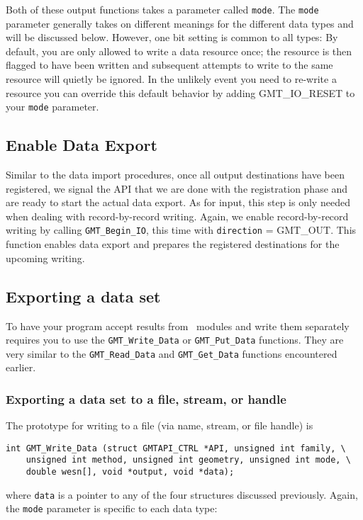 \documentclass[11pt]{report}
\begin{document}
Both of these output functions takes a parameter called \texttt{mode}.  The \texttt{mode} parameter generally
takes on different meanings for the different data types and will be discussed below.
However, one bit setting is common to all types: By default, you are only allowed to write a
data resource once; the resource is then flagged to have been written and subsequent attempts to write
to the same resource will quietly be ignored.  In the unlikely event you need to re-write a
resource you can override this default behavior by adding GMT\_IO\_RESET to your \texttt{mode} parameter.

\subsection{Enable Data Export}

Similar to the data import procedures, once all output destinations have been registered, we signal the API that we are done with the registration
phase and are ready to start the actual data export.  As for input, this step is only needed when dealing with record-by-record writing.
Again, we enable record-by-record writing by calling \texttt{GMT\_Begin\_IO}, this time with \texttt{direction} = GMT\_OUT.
This function enables data export and prepares the registered destinations for the upcoming writing.  


\subsection{Exporting a data set}

To have your program accept results from \GMT\ modules and write them
separately requires you to use the \texttt{GMT\_Write\_Data} or \texttt{GMT\_Put\_Data} functions.  They are
very similar to the \texttt{GMT\_Read\_Data} and \texttt{GMT\_Get\_Data} functions encountered earlier.

\subsubsection{Exporting a data set to a file, stream, or handle}
The prototype for writing to a file (via name, stream, or file handle) is

\begin{verbatim}
int GMT_Write_Data (struct GMTAPI_CTRL *API, unsigned int family, \
    unsigned int method, unsigned int geometry, unsigned int mode, \
    double wesn[], void *output, void *data);
\end{verbatim}
where \texttt{data} is a pointer to any of the four structures
discussed previously.  Again, the \texttt{mode} parameter is specific to
each data type:
\end{document}
